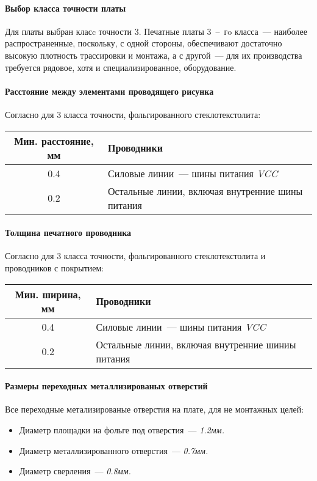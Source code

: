 \paragraph{Выбор класса точности платы}
Для платы выбран класc точности 3.
Печатные платы 3~--~гo класса~--- наиболее распространенные, поскольку, с одной
стороны, обеспечивают достаточно высокую плотность трассировки и монтажа, а с
другой~--- для их производства требуется рядовое, хотя и специализированное,
оборудование.

\paragraph{Расстояние между элементами проводящего рисунка}
Согласно \cite[Табл. 7]{GOST_23751_86} для 3 класса точности,
фольгированного стеклотекстолита:

\begin{tabular}{|c|l|}
    \hline
    Мин. расстояние, мм & Проводники \\
    \hline
    0.4 & Силовые линии~--- шины питания \textit{VCC} \\
    \hline
    0.2 & Остальные линии, включая внутренние шины питания \\
    \hline
\end{tabular}

\paragraph{Толщина печатного проводника}
Согласно \cite[Табл. 9]{GOST_23751_86} для 3 класса точности,
фольгированного стеклотекстолита и проводников с покрытием:

\begin{tabular}{|c|l|}
    \hline
    Мин. ширина, мм & Проводники \\
    \hline
    0.4 & Силовые линии~--- шины питания \textit{VCC} \\
    \hline
    0.2 & Остальные линии, включая внутренние шиниы питания \\
    \hline
\end{tabular}

\paragraph{Размеры переходных металлизированых отверстий}
Все переходные метализированые отверстия на плате, для не монтажных целей:

\begin{itemize}
    \item Диаметр площадки на фольге под отверстия~--- \textit{1.2мм.}
    \item Диаметр металлизированного отверстия~--- \textit{0.7мм.}
    \item Диаметр сверления~--- \textit{0.8мм.}
\end{itemize}
